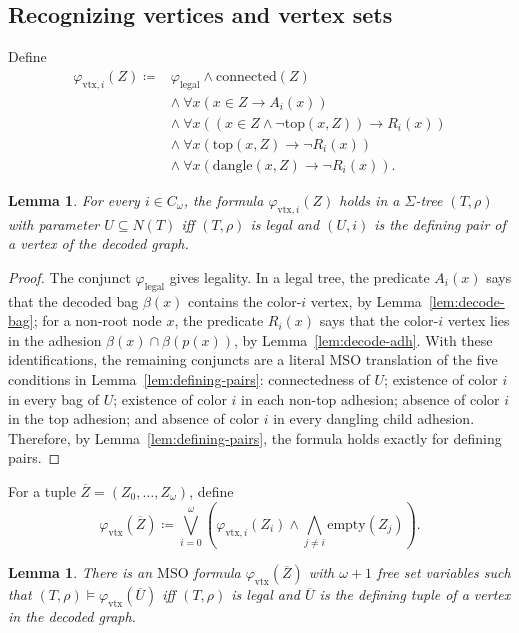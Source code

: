 \documentclass[11pt]{article}
\newtheorem{lemma}[theorem]{Lemma}
\theoremstyle{definition}
\newcommand{\MSO}{\ensuremath{\mathrm{MSO}}}
\newcommand{\defeq}{\coloneqq}
\newcommand{\topnode}{\mathrm{top}}
\newcommand{\legal}{\mathrm{legal}}
\newcommand{\vtx}{\mathrm{vtx}}
\newcommand{\emptysetf}{\mathrm{empty}}
\newcommand{\conn}{\mathrm{connected}}
\newcommand{\dang}{\mathrm{dangle}}
\newcommand{\tuple}[1]{\overline{#1}}
\begin{document}
\subsection{Recognizing vertices and vertex sets}

Define
\[
\begin{aligned}
  \varphi_{\vtx,i}(Z) \defeq{}&
  \varphi_{\legal}\wedge \conn(Z)\\
  &\wedge\ \forall x(x\in Z\to A_i(x))\\
  &\wedge\ \forall x((x\in Z\wedge\neg\topnode(x,Z))\to R_i(x))\\
  &\wedge\ \forall x(\topnode(x,Z)\to \neg R_i(x))\\
  &\wedge\ \forall x(\dang(x,Z)\to \neg R_i(x)).
\end{aligned}
\]

\begin{lemma}\label{lem:vtx-i}
For every \(i\in C_\omega\), the formula \(\varphi_{\vtx,i}(Z)\) holds in a
\(\Sigma\)-tree \((T,\rho)\) with parameter \(U\subseteq N(T)\) iff \((T,\rho)\) is
legal and \((U,i)\) is the defining pair of a vertex of the decoded graph.
\end{lemma}

\begin{proof}
The conjunct \(\varphi_{\legal}\) gives legality.  In a legal tree, the predicate
\(A_i(x)\) says that the decoded bag \(\beta(x)\) contains the color-\(i\) vertex,
by Lemma~\ref{lem:decode-bag}; for a non-root node \(x\), the predicate \(R_i(x)\)
says that the color-\(i\) vertex lies in the adhesion
\(\beta(x)\cap\beta(p(x))\), by Lemma~\ref{lem:decode-adh}.  With these
identifications, the remaining conjuncts are a literal \MSO{} translation of the
five conditions in Lemma~\ref{lem:defining-pairs}: connectedness of \(U\);
existence of color \(i\) in every bag of \(U\); existence of color \(i\) in each
non-top adhesion; absence of color \(i\) in the top adhesion; and absence of color
\(i\) in every dangling child adhesion.  Therefore, by
Lemma~\ref{lem:defining-pairs}, the formula holds exactly for defining pairs.
\end{proof}

For a tuple \(\tuple Z=(Z_0,\ldots,Z_\omega)\), define
\[
  \varphi_{\vtx}(\tuple Z)
  \defeq
  \bigvee_{i=0}^{\omega}
  \left(
    \varphi_{\vtx,i}(Z_i)\wedge
    \bigwedge_{j\ne i}\emptysetf(Z_j)
  \right).
\]

\begin{lemma}\label{lem:vtx}
There is an \MSO{} formula \(\varphi_{\vtx}(\tuple Z)\) with \(\omega+1\) free set
variables such that \((T,\rho)\models\varphi_{\vtx}(\tuple U)\) iff \((T,\rho)\) is legal and \(\tuple U\) is
the defining tuple of a vertex in the decoded graph.
\end{lemma}
\end{document}
